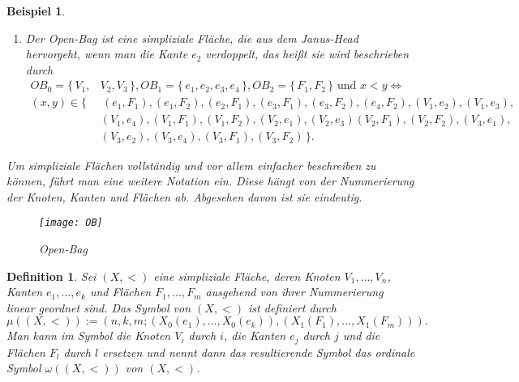 \documentclass[12pt,titlepage,twoside,cleardoublepage]{article}
\theoremstyle{nummermitklammern}
\newtheorem{bsp}[temp]{Beispiel}
\newtheorem{definition}[temp]{Definition}
\newtheorem{definition}[zahl]{Definition}
\newtheorem{bsp}[zahl]{Beispiel}
\numberwithin{equation}{section}
\begin{document}
\begin{bsp}
\begin{enumerate}
\begin{figure}[H]
\begin{center}
\texttt{[image: JanusHead]}
\end{center}
\caption{Janus-Head}
\end{figure}
 \item 
 Der \emph{Open-Bag} ist eine simpliziale Fläche, die aus dem \emph{Janus-Head} hervorgeht, wenn man die Kante $e_{2}$ verdoppelt, das heißt sie wird beschrieben durch
 \begin{align*}
  OB_{0}=\{\,V_{1},&V_{2},V_{3}\,\},OB_{1}=\{\,e_{1},e_{2},e_{3},e_{4} \,\}, OB_{2}=\{\,F_{1},F_{2}\,\} \text{ und } x<y \Leftrightarrow\\
 (x,y)\in\{&\,(e_{1},F_{1}),(e_{1},F_{2}),(e_{2},F_{1}),(e_{3},F_{1}),(e_{3},F_{2}),(e_{4},F_{2}),(V_{1},e_{2}),(V_{1},e_{3}),\\ &(V_{1},e_{4}),
  (V_{1},F_{1}),(V_{1},F_{2}),(V_{2},e_{1}),(V_{2},e_{3})
 (V_{2},F_{1}), (V_{2},F_{2}), (V_{3},e_{1}),\\&(V_{3},e_{2}),(V_{3},e_{4}),(V_{3},F_{1}),(V_3,F_2) \,\}.
 \end{align*}
 \end{enumerate}
Um simpliziale Flächen vollständig und vor allem einfacher beschreiben zu können, führt man eine weitere Notation ein. Diese hängt von der Nummerierung der Knoten, Kanten und Flächen ab. Abgesehen davon ist sie eindeutig.
\begin{figure}[H]
\begin{center}
\texttt{[image: OB]}
\end{center}
\caption{Open-Bag}
\end{figure}
\end{bsp}
\begin{definition}
 Sei $(X,<)$ eine simpliziale Fläche, deren Knoten $V_{1},\ldots,V_{n}$, Kanten $e_{1},\ldots,e_{k}$ und Flächen $F_{1},\ldots,F_{m}$ ausgehend von ihrer Nummerierung linear geordnet sind. Das \emph{Symbol} von $(X,<)$ ist definiert durch 
\[
\mu((X,<)):=(n,k,m;(X_{0}(e_{1}),\ldots,X_{0}(e_{k})),(X_{1}(F_{1}),\ldots,X_{1}(F_{m}))).
\]
Man kann im Symbol die Knoten $V_{i}$ durch $i$, die Kanten $e_{j}$ durch $j$ und die Flächen $F_{l}$ durch $l$ ersetzen und nennt dann das resultierende Symbol das \emph{ordinale Symbol} $\omega((X,<))$ von $(X,<)$.
\end{definition}
\end{document}
